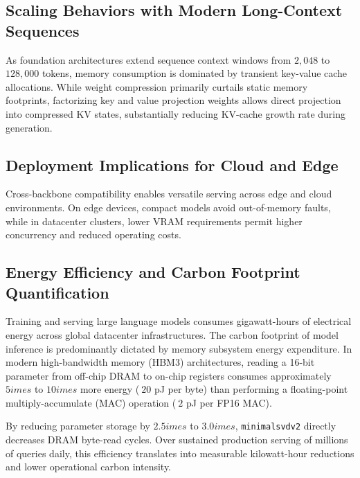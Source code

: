 \subsection{Scaling Behaviors with Modern Long-Context Sequences}
As foundation architectures extend sequence context windows from $2{,}048$ to $128{,}000$ tokens, memory consumption is dominated by transient key-value cache allocations. While weight compression primarily curtails static memory footprints, factorizing key and value projection weights allows direct projection into compressed KV states, substantially reducing KV-cache growth rate during generation.

\subsection{Deployment Implications for Cloud and Edge}
Cross-backbone compatibility enables versatile serving across edge and cloud environments. On edge devices, compact models avoid out-of-memory faults, while in datacenter clusters, lower VRAM requirements permit higher concurrency and reduced operating costs.

\subsection{Energy Efficiency and Carbon Footprint Quantification}
Training and serving large language models consumes gigawatt-hours of electrical energy across global datacenter infrastructures. The carbon footprint of model inference is predominantly dictated by memory subsystem energy expenditure. In modern high-bandwidth memory (HBM3) architectures, reading a 16-bit parameter from off-chip DRAM to on-chip registers consumes approximately $5	imes$ to $10	imes$ more energy ($~20$ pJ per byte) than performing a floating-point multiply-accumulate (MAC) operation ($~2$ pJ per FP16 MAC).

By reducing parameter storage by $2.5	imes$ to $3.0	imes$, \texttt{minimalsvdv2} directly decreases DRAM byte-read cycles. Over sustained production serving of millions of queries daily, this efficiency translates into measurable kilowatt-hour reductions and lower operational carbon intensity.
